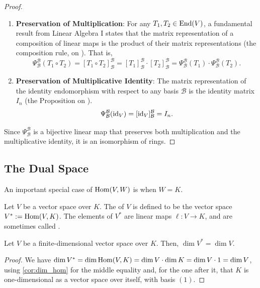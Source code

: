\begin{proof}
  \begin{enumerate}
    \item \textbf{Preservation of Multiplication}: For any $T_1, T_2 \in \operatorname{End}(V)$, a fundamental result from Linear Algebra I states that the matrix representation of a composition of linear maps is the product of their matrix representations (the composition rule, on ). That is,
    \[ \Psi_{\mathcal{B}}^{\mathcal{B}}(T_1 \circ T_2) = [T_1 \circ T_2]_{\mathcal{B}}^{\mathcal{B}} = [T_1]_{\mathcal{B}}^{\mathcal{B}} \cdot [T_2]_{\mathcal{B}}^{\mathcal{B}} = \Psi_{\mathcal{B}}^{\mathcal{B}}(T_1) \cdot \Psi_{\mathcal{B}}^{\mathcal{B}}(T_2). \]
    \item \textbf{Preservation of Multiplicative Identity}: The matrix representation of the identity endomorphism with respect to any basis $\mathcal{B}$ is the identity matrix $I_n$ (the Proposition on ).
    \[ \Psi_{\mathcal{B}}^{\mathcal{B}}(\operatorname{id}_V) = [\operatorname{id}_V]_{\mathcal{B}}^{\mathcal{B}} = I_n. \]
  \end{enumerate}
  Since $\Psi_{\mathcal{B}}^{\mathcal{B}}$ is a bijective linear map that preserves both multiplication and the multiplicative identity, it is an isomorphism of rings.
\end{proof}


\subsection{The Dual Space}
An important special case of $\operatorname{Hom}(V,W)$ is when $W=K$.

\begin{definition}
  \label{def:dual_space}
  Let $V$ be a vector space over $K$. The  of $V$ is defined to be the vector space $V^* := \operatorname{Hom}(V,K)$. The elements of $V^*$ are linear maps $\ell \colon V \to K$, and are sometimes called .
\end{definition}

\begin{corollary}
  \label{cor:dim_dual}
  Let $V$ be a finite-di\-men\-sional vector space over $K$. Then, $\dim V^* = \dim V$.
\end{corollary}

\begin{proof}
  We have $\dim V^* = \dim \operatorname{Hom}(V,K) = \dim V \cdot \dim K = \dim V \cdot 1 = \dim V$, using \cref{cor:dim_hom} for the middle equality and, for the one after it, that $K$ is one-dimensional as a vector space over itself, with basis $(1)$.
\end{proof}

